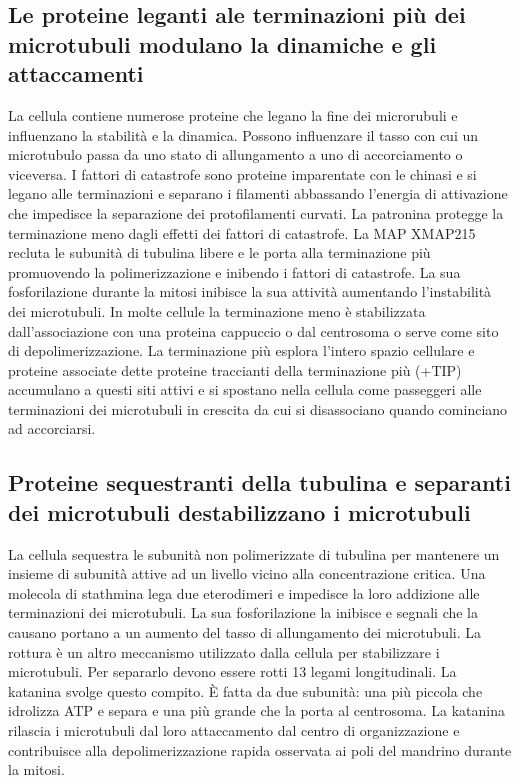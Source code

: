 \subsection{Le proteine leganti ale terminazioni pi\`u dei microtubuli modulano la dinamiche e gli attaccamenti}
La cellula contiene numerose proteine che legano la fine dei microrubuli e influenzano la stabilit\`a e la dinamica. Possono influenzare il tasso con cui un microtubulo passa da uno
stato di allungamento a uno di accorciamento o viceversa. I fattori di catastrofe sono proteine imparentate con le chinasi e si legano alle terminazioni e separano i filamenti abbassando
l'energia di attivazione che impedisce la separazione dei protofilamenti curvati. La patronina protegge la terminazione meno dagli effetti dei fattori di catastrofe. La MAP
XMAP215 recluta le subunit\`a di tubulina libere e le porta alla terminazione pi\`u promuovendo la polimerizzazione e inibendo i fattori di catastrofe. La sua fosforilazione durante
la mitosi inibisce la sua attivit\`a aumentando l'instabilit\`a dei microtubuli. In molte cellule la terminazione meno \`e stabilizzata dall'associazione con una proteina cappuccio o
dal centrosoma o serve come sito di depolimerizzazione. La terminazione pi\`u esplora l'intero spazio cellulare e proteine associate dette proteine traccianti della terminazione pi\`u
(+TIP) accumulano a questi siti attivi e si spostano nella cellula come passeggeri alle terminazioni dei microtubuli in crescita da cui si disassociano quando cominciano ad accorciarsi.
\subsection{Proteine sequestranti della tubulina e separanti dei microtubuli destabilizzano i microtubuli}
La cellula sequestra le subunit\`a non polimerizzate di tubulina per mantenere un insieme di subunit\`a attive ad un livello vicino alla concentrazione critica. Una molecola di stathmina
lega due eterodimeri e impedisce la loro addizione alle terminazioni dei microtubuli. La sua fosforilazione la inibisce e segnali che la causano portano a un aumento del tasso di 
allungamento dei microtubuli. La rottura \`e un altro meccanismo utilizzato dalla cellula per stabilizzare i microtubuli. Per separarlo devono essere rotti 13 legami longitudinali. La
katanina svolge questo compito. \`E fatta da due subunit\`a: una pi\`u piccola che idrolizza ATP e separa e una pi\`u grande che la porta al centrosoma. La katanina rilascia i 
microtubuli dal loro attaccamento dal centro di organizzazione e contribuisce alla depolimerizzazione rapida osservata ai poli del mandrino durante la mitosi. 
